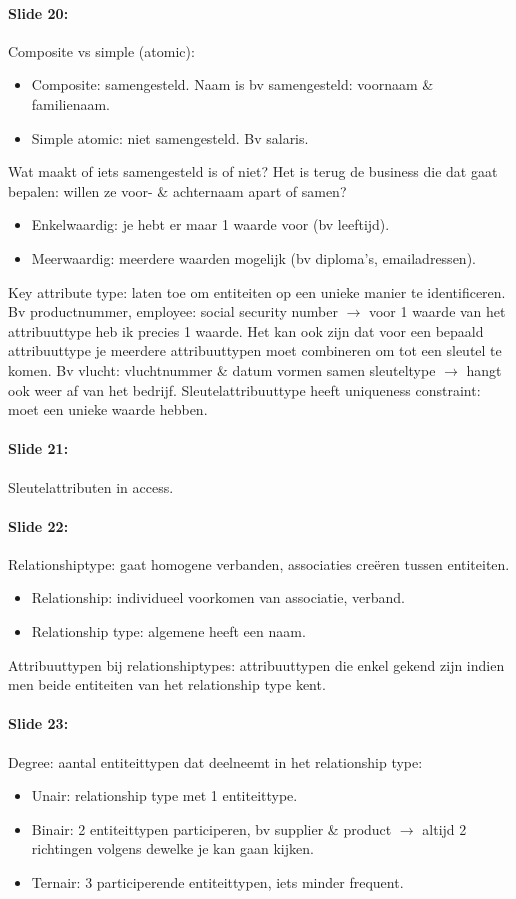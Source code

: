 \documentclass[10pt,a4paper]{report}
\begin{document}
\paragraph{Slide 20:}Composite vs simple (atomic):
\begin{itemize}
\item Composite: samengesteld. Naam is bv samengesteld: voornaam \& familienaam.
\item Simple atomic: niet samengesteld. Bv salaris.
\end{itemize}
Wat maakt of iets samengesteld is of niet? Het is terug de business die dat gaat bepalen: willen ze voor- \& achternaam apart of samen?
\begin{itemize}
\item Enkelwaardig: je hebt er maar 1 waarde voor (bv leeftijd). 
\item Meerwaardig: meerdere waarden mogelijk (bv diploma's, emailadressen).
\end{itemize}
Key attribute type: laten toe om entiteiten op een unieke manier te identificeren. Bv productnummer, employee: social security number $\rightarrow$ voor 1 waarde van het attribuuttype heb ik precies 1 waarde. 
Het kan ook zijn dat voor een bepaald attribuuttype je meerdere attribuuttypen moet combineren om tot een sleutel te komen. Bv vlucht: vluchtnummer \& datum vormen samen sleuteltype $\rightarrow$ hangt ook weer af van het bedrijf.
Sleutelattribuuttype heeft uniqueness constraint: moet een unieke waarde hebben.

\paragraph{Slide 21:}Sleutelattributen in access.

\paragraph{Slide 22:}Relationshiptype: gaat homogene verbanden, associaties creëren tussen entiteiten.
\begin{itemize}
\item Relationship: individueel voorkomen van associatie, verband.
\item Relationship type: algemene heeft een naam.
\end{itemize}
Attribuuttypen bij relationshiptypes: attribuuttypen die enkel gekend zijn indien men beide entiteiten van het relationship type kent.

\paragraph{Slide 23:}Degree: aantal entiteittypen dat deelneemt in het relationship type:
\begin{itemize}
\item Unair: relationship type met 1 entiteittype.
\item Binair: 2 entiteittypen participeren, bv supplier \& product $\rightarrow$ altijd 2 richtingen volgens dewelke je kan gaan kijken.
\item Ternair: 3 participerende entiteittypen, iets minder frequent.
\end{itemize}
\end{document}

